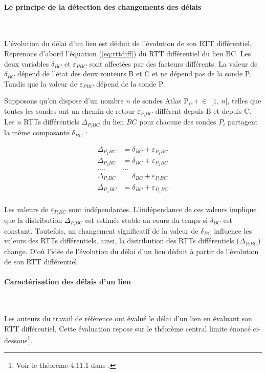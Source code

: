\paragraph{Le principe de la détection des changements des délais}~

L'évolution du délai d'un lien est déduit de l'évolution de son RTT différentiel. Reprenons d'abord l'équation (\ref{eq:rttdiff}) du RTT différentiel du lien BC. Les deux variables $\delta_{BC}$ et $\varepsilon_{PBC}$ sont affectées par des facteurs différents.
La valeur de  $\delta_{BC}$ dépend de l'état des deux routeurs B et C et ne dépend pas de la sonde P. Tandis que la valeur de $\varepsilon_{PBC}$ dépend de la sonde P.

Supposons qu'on dispose d'un nombre $n$ de sondes Atlas P$_i$, $i$ $\in$ [$1$, $n$], telles que toutes les sondes ont un chemin de retour  $\varepsilon_{P_{i}BC}$ différent depuis B et depuis C.  Les $n$ RTTs différentiels $\Delta_{P{_i}BC}$ du lien $BC$ pour chacune des sondes $P_i$  partagent la même composante $\delta_{BC}$ :


\begin{align*}
\Delta_{P_{1}BC} &= \delta_{BC} + \varepsilon_{P_{1}BC}\\
\Delta_{P_{2}BC} &= \delta_{BC} + \varepsilon_{P_{2}BC}\\
.... &   ... \\
\Delta_{P_{i}BC} &= \delta_{BC} + \varepsilon_{P_{i}BC}\\
\Delta_{P_{n}BC} &= \delta_{BC} + \varepsilon_{P_{n}BC}\\
\end{align*}

Les valeurs de  $\varepsilon_{P_{i}BC}$ sont  indépendantes. L'indépendance de ces valeurs implique que la distribution $\Delta_{P_{i}BC}$ est estimée  stable au cours du temps si $\delta_{BC}$ est constant. Toutefois, un changement significatif de la valeur de $\delta_{BC}$ influence les valeurs des RTTs différentiels, ainsi,  la distribution des RTTs différentiels ($\Delta_{P_{i}BC}$) change. D'où l'idée de l'évolution du délai d'un lien déduit  à partir de l'évolution de son RTT différentiel.

\paragraph{Caractérisation des délais d'un lien}~

Les auteurs du travail de référence  ont évalué le délai d'un lien en évaluant son RTT différentiel. Cette évaluation repose sur le théorème central limite énoncé ci-dessous\footnote{Voir le théorème  $ 4.11.1 $ dans \cite{lefebvre2003cours}.}.

